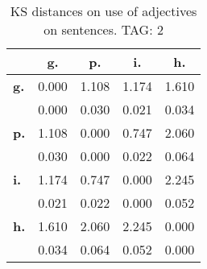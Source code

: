 \begin{table}[h!]
\begin{center}
\begin{tabular}{| l || c | c | c | c |}\hline
 & {\bf g.} & {\bf p.} & {\bf i.} & {\bf h.} \\\hline\hline
{\bf g.} & 0.000 & 1.108 & 1.174 & 1.610 \\
{\bf } & 0.000 & 0.030 & 0.021 & 0.034 \\\hline
{\bf p.} & 1.108 & 0.000 & 0.747 & 2.060 \\
{\bf } & 0.030 & 0.000 & 0.022 & 0.064 \\\hline
{\bf i.} & 1.174 & 0.747 & 0.000 & 2.245 \\
{\bf } & 0.021 & 0.022 & 0.000 & 0.052 \\\hline
{\bf h.} & 1.610 & 2.060 & 2.245 & 0.000 \\
{\bf } & 0.034 & 0.064 & 0.052 & 0.000 \\\hline
\end{tabular}
\caption{KS distances on use of adjectives on sentences. TAG: 2}
\end{center}
\end{table}